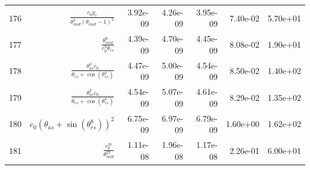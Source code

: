 \begin{tabularx}{\textwidth}{lRRRRRl}
176  &  $ \displaystyle\frac{c_{0} y_c}{\theta_{mid}^{2} \left(\theta_{mid} - 1\right)^{2}} $  &  3.92e-09  &  4.26e-09  &  3.95e-09  &  7.40e-02  &  5.70e+01  \\ 
177  &  $ \displaystyle\frac{\theta_{mid}^{9}}{c_{0}^{9} \theta_{rs}} $  &  4.39e-09  &  4.70e-09  &  4.45e-09  &  8.08e-02  &  1.90e+01  \\ 
178  &  $ \displaystyle\frac{\theta_{as}^{3} c_{0}}{\theta_{rs} + \cos{\left(\theta_{rs}^{4} \right)}} $  &  4.47e-09  &  5.00e-09  &  4.54e-09  &  8.50e-02  &  1.40e+02  \\ 
179  &  $ \displaystyle\frac{\theta_{as}^{2} c_{0}}{\theta_{rs} + \cos{\left(\theta_{rs}^{4} \right)}} $  &  4.54e-09  &  5.07e-09  &  4.61e-09  &  8.29e-02  &  1.35e+02  \\ 
180  &  $ c_{0} \left(\theta_{as} + \sin{\left(\theta_{rs}^{8} \right)}\right)^{2} $  &  6.75e-09  &  6.97e-09  &  6.79e-09  &  1.60e+00  &  1.62e+02  \\ 
181  &  $ \displaystyle\frac{c_{0}^{27}}{\theta_{mid}^{27}} $  &  1.11e-08  &  1.96e-08  &  1.17e-08  &  2.26e-01  &  6.00e+01  \\ 
\bottomrule
\end{tabularx}
